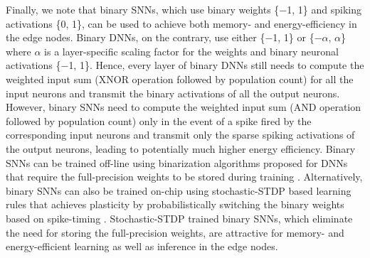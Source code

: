 Finally, we note that binary SNNs, which use binary weights \{$-$1, 1\} and spiking activations \{0, 1\}, can be used to achieve both memory- and energy-efficiency in the edge nodes. Binary DNNs, on the contrary, use either \{$-$1, 1\} \cite{courbariaux2015binaryconnect} or \{$-\alpha$, $\alpha$\} \cite{rastegari2016xnor} where $\alpha$ is a layer-specific scaling factor for the weights and binary neuronal activations \{$-$1, 1\}. Hence, every layer of binary DNNs still needs to compute the weighted input sum (XNOR operation followed by population count) for all the input neurons and transmit the binary activations of all the output neurons. However, binary SNNs need to compute the weighted input sum (AND operation followed by population count) only in the event of a spike fired by the corresponding input neurons and transmit only the sparse spiking activations of the output neurons, leading to potentially much higher energy efficiency. Binary SNNs can be trained off-line using binarization algorithms proposed for DNNs that require the full-precision weights to be stored during training \cite{courbariaux2015binaryconnect, rastegari2016xnor, hubara2017quantized}. Alternatively, binary SNNs can also be trained on-chip using stochastic-STDP based learning rules that achieves plasticity by probabilistically switching the binary weights based on spike-timing \cite{suri2013bio, querlioz2015bioinspired, srinivasan2016magnetic, srinivasan2019restocnet}. Stochastic-STDP trained binary SNNs, which eliminate the need for storing the full-precision weights, are attractive for memory- and energy-efficient learning as well as inference in the edge nodes.
